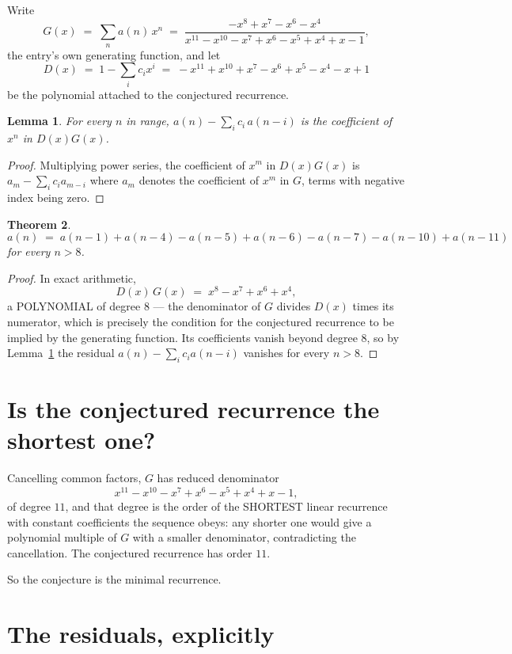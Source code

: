 \documentclass[11pt,a4paper]{article}
\theoremstyle{plain}
\newtheorem{theorem}{Theorem}
\newtheorem{lemma}[theorem]{Lemma}
\theoremstyle{definition}
\begin{document}
Write
\[
G(x)\;=\;\sum_{n}a(n)\,x^{n}\;=\;\frac{- x^{8} + x^{7} - x^{6} - x^{4}}{x^{11} - x^{10} - x^{7} + x^{6} - x^{5} + x^{4} + x - 1},
\]
the entry's own generating function, and let
\[
D(x)\;=\;1-\sum_i c_i x^{i}\;=\;- x^{11} + x^{10} + x^{7} - x^{6} + x^{5} - x^{4} - x + 1
\]
be the polynomial attached to the conjectured recurrence.

\begin{lemma}\label{lem:key}
For every $n$ in range, $a(n)-\sum_i c_i\,a(n-i)$ is the coefficient of $x^{n}$ in
$D(x)G(x)$.
\end{lemma}

\begin{proof}
Multiplying power series, the coefficient of $x^{m}$ in $D(x)G(x)$ is
$a_m-\sum_i c_i a_{m-i}$ where $a_m$ denotes the coefficient of $x^{m}$ in $G$, terms with
negative index being zero.
\end{proof}

\begin{theorem}
\[
a(n)\;=\;a(n-1) + a(n-4) - a(n-5) + a(n-6) - a(n-7) - a(n-10) + a(n-11)
\]
for every $n>8$.
\end{theorem}

\begin{proof}
In exact arithmetic,
\[
D(x)\,G(x)\;=\;x^{8} - x^{7} + x^{6} + x^{4},
\]
a POLYNOMIAL of degree $8$ --- the denominator of $G$ divides $D(x)$ times its numerator,
which is precisely the condition for the conjectured recurrence to be implied by the
generating function. Its coefficients vanish beyond degree $8$, so by
Lemma~\ref{lem:key} the residual $a(n)-\sum_ic_ia(n-i)$ vanishes for every
$n>8$.
\end{proof}

\section{Is the conjectured recurrence the shortest one?}

Cancelling common factors, $G$ has reduced denominator
\[
x^{11} - x^{10} - x^{7} + x^{6} - x^{5} + x^{4} + x - 1,
\]
of degree $11$, and that degree is the order of the SHORTEST linear recurrence with
constant coefficients the sequence obeys: any shorter one would give a polynomial multiple of
$G$ with a smaller denominator, contradicting the cancellation. The conjectured recurrence has
order $11$.

So the conjecture is the minimal recurrence.

\section{The residuals, explicitly}
\end{document}
